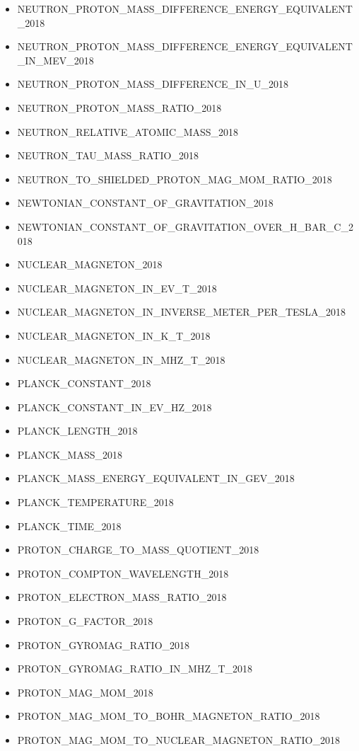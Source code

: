 \begin{itemize}
  NEUTRON\_PROTON\_MASS\_DIFFERENCE\_2018
\item
  NEUTRON\_PROTON\_MASS\_DIFFERENCE\_ENERGY\_EQUIVALENT\_2018
\item
  NEUTRON\_PROTON\_MASS\_DIFFERENCE\_ENERGY\_EQUIVALENT\_IN\_MEV\_2018
\item
  NEUTRON\_PROTON\_MASS\_DIFFERENCE\_IN\_U\_2018
\item
  NEUTRON\_PROTON\_MASS\_RATIO\_2018
\item
  NEUTRON\_RELATIVE\_ATOMIC\_MASS\_2018
\item
  NEUTRON\_TAU\_MASS\_RATIO\_2018
\item
  NEUTRON\_TO\_SHIELDED\_PROTON\_MAG\_MOM\_RATIO\_2018
\item
  NEWTONIAN\_CONSTANT\_OF\_GRAVITATION\_2018
\item
  NEWTONIAN\_CONSTANT\_OF\_GRAVITATION\_OVER\_H\_BAR\_C\_2018
\item
  NUCLEAR\_MAGNETON\_2018
\item
  NUCLEAR\_MAGNETON\_IN\_EV\_T\_2018
\item
  NUCLEAR\_MAGNETON\_IN\_INVERSE\_METER\_PER\_TESLA\_2018
\item
  NUCLEAR\_MAGNETON\_IN\_K\_T\_2018
\item
  NUCLEAR\_MAGNETON\_IN\_MHZ\_T\_2018
\item
  PLANCK\_CONSTANT\_2018
\item
  PLANCK\_CONSTANT\_IN\_EV\_HZ\_2018
\item
  PLANCK\_LENGTH\_2018
\item
  PLANCK\_MASS\_2018
\item
  PLANCK\_MASS\_ENERGY\_EQUIVALENT\_IN\_GEV\_2018
\item
  PLANCK\_TEMPERATURE\_2018
\item
  PLANCK\_TIME\_2018
\item
  PROTON\_CHARGE\_TO\_MASS\_QUOTIENT\_2018
\item
  PROTON\_COMPTON\_WAVELENGTH\_2018
\item
  PROTON\_ELECTRON\_MASS\_RATIO\_2018
\item
  PROTON\_G\_FACTOR\_2018
\item
  PROTON\_GYROMAG\_RATIO\_2018
\item
  PROTON\_GYROMAG\_RATIO\_IN\_MHZ\_T\_2018
\item
  PROTON\_MAG\_MOM\_2018
\item
  PROTON\_MAG\_MOM\_TO\_BOHR\_MAGNETON\_RATIO\_2018
\item
  PROTON\_MAG\_MOM\_TO\_NUCLEAR\_MAGNETON\_RATIO\_2018

\end{itemize}
